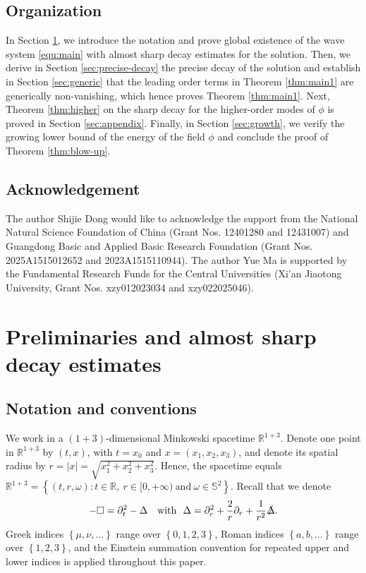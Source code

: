 \documentclass[a4paper,reqno]{amsart}
\theoremstyle{definition}
\numberwithin{equation}{section}
\def \R {{\mathbb{R} }}
\def\Deltas{\slashed{\Delta}}
\begin{document}
 
\subsection{Organization}

In Section \ref{sect:PreliminaryandAlmostsharp}, we introduce the notation and prove global existence of the wave system \eqref{equ:main} with almost sharp decay estimates for the solution.
Then, we derive in Section \ref{sec:precise-decay} the precise decay of the solution and 
establish in Section \ref{sec:generic} that the leading order terms in Theorem \ref{thm:main1} are generically non-vanishing, which hence proves Theorem \ref{thm:main1}. 
Next, Theorem \ref{thm:higher} on the sharp decay for the higher-order modes of $\phi$ is proved in Section \ref{sec:appendix}. Finally, in Section \ref{sec:growth}, we verify the growing lower bound of the energy of the field $\phi$ and conclude the proof of Theorem \ref{thm:blow-up}.





 \subsection*{Acknowledgement}

The author Shijie Dong would like to acknowledge the support from the National Natural Science Foundation of China (Grant Nos. 12401280 and 12431007) and Guangdong Basic and Applied Basic Research Foundation (Grant Nos. 2025A1515012652 and 2023A1515110944).  The author Yue Ma is supported by the Fundamental Research Funds for the Central Universities (Xi'an Jiaotong University, Grant Nos. xzy012023034 and xzy022025046).


 
\section{Preliminaries and almost sharp decay estimates}
\label{sect:PreliminaryandAlmostsharp}


 \subsection{Notation and conventions}\label{SS:nota}
We work in  {a $(1+3)$-}dimensional Minkowski spacetime $\R^{1+3}$. {Denote} one point {in $\R^{1+3}$} by {$(t,x)$, with $t=x_0$ and $x=(x_{1},x_{2},x_{3})$,} and {denote} its spatial radius by $r{=|x|=}\sqrt{x_{1}^{2}+x_{2}^{2}+x_{3}^{2}}$. Hence, the spacetime equals $\R^{1+3}=\left\{(t,r,\omega):t\in \R,\ r\in [0,+\infty)\ \mbox{and}\ \omega\in \mathbb{S}^{2}\right\}$.
Recall that we denote
\begin{equation*} 
-\Box=\partial_{t}^{2}-\Delta\quad \mbox{with}\ \ \Delta=\partial_{r}^{2}+\frac{2}{r}\partial_{r}+\frac{1}{r^{2}}\Deltas.
\end{equation*}
Greek indices $\left\{\mu,\nu,\dots\right\}$ range over $\left\{0,1,2,3\right\}$, Roman indices $\left\{a,b,\dots\right\}$ range over $\left\{1,2,3\right\}$, and the Einstein summation convention for repeated upper and lower indices is applied throughout this paper.
 
\end{document}
